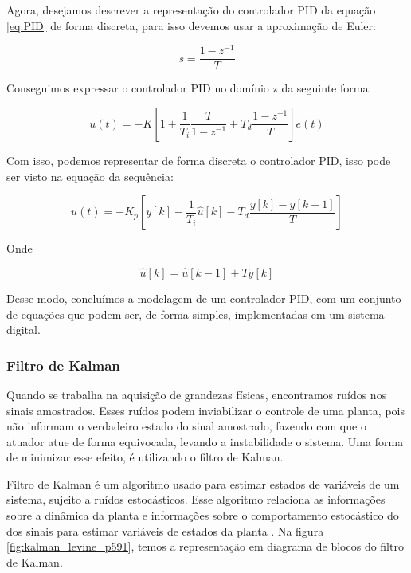 Agora, desejamos descrever a representação do controlador PID da equação \ref{eq:PID} de forma discreta, para isso devemos usar a aproximação de Euler:

\begin{equation}
  s = \frac{1-z^{-1}}{T}
\end{equation}

Conseguimos expressar o controlador PID no domínio z da seguinte forma:

\begin{equation}
  u(t) = -K\left[1 + \frac{1}{T_i}\frac{T}{1-z^{-1}} + T_d\frac{1-z^{-1}}{T} \right]e(t)
\end{equation}

Com isso, podemos representar de forma discreta o controlador PID, isso pode ser visto na equação da sequência:

\begin{equation}
  u(t) = -K_p\left[y[k]-\frac{1}{T_i}{\hat{u}[k]}-T_d\frac{y[k]-y[k-1]}{T}\right]
\end{equation}

Onde

\begin{equation}
  \hat{u}[k] = \hat{u}[k-1] +Ty[k]
\end{equation}

Desse modo, concluímos a modelagem de um controlador PID, com um conjunto de equações que podem ser, de forma simples, implementadas em um sistema digital.


\subsubsection{Filtro de Kalman}

Quando se trabalha na aquisição de grandezas físicas, encontramos ruídos nos sinais amostrados. Esses ruídos podem inviabilizar o controle de uma planta, pois não informam o verdadeiro estado do sinal amostrado, fazendo com que o atuador atue de forma equivocada, levando a instabilidade o sistema. Uma forma de minimizar esse efeito, é utilizando o filtro de Kalman.

Filtro de Kalman é um algoritmo usado para estimar estados de variáveis de um sistema, sujeito a ruídos estocásticos. Esse algoritmo relaciona as informações sobre a dinâmica da planta e informações sobre o comportamento estocástico do dos sinais para estimar variáveis de estados da planta \cite{Levine1996}. Na figura \ref{fig:kalman_levine_p591}, temos a representação em diagrama de blocos do filtro de Kalman.


